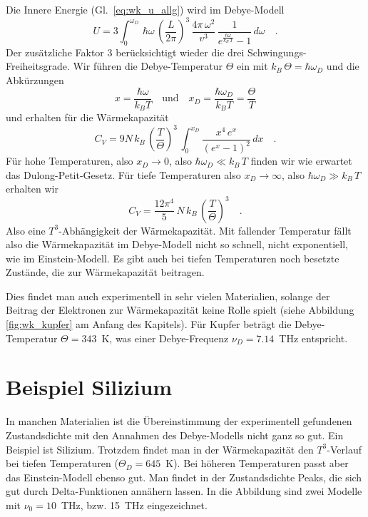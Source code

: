 Die Innere Energie (Gl.~\ref{eq:wk_u_allg}) wird im Debye-Modell
\begin{equation}
U = 3 \int_0^{\omega_D} \, \hbar \omega \,  \left( \frac{L}{2 \pi} \right)^3 \,     \frac{ 4 \pi \, \omega^2 }{v^3}  \,
\frac{1}{e^{\frac{\hbar \omega}{k_B \, T} }- 1} \, d\omega \quad .
\end{equation}
Der zusätzliche Faktor 3 berücksichtigt wieder die drei Schwingungs-Freiheitsgrade. Wir führen die Debye-Temperatur $\Theta$ ein mit $k_B \, \Theta = \hbar \omega_D$ und die Abkürzungen
\begin{equation}
x = \frac{\hbar \omega}{k_B T} \quad \text{und} \quad
x_D = \frac{\hbar \omega_D}{k_B T}  = \frac{\Theta}{T}
\end{equation}
und erhalten für die Wärmekapazität
\begin{equation}
C_V = 9 N \, k_B \, \left(\frac{T}{\Theta} \right)^3 \,
\int_0^{x_D} \frac{x^4 \, e^x}{\left(  e^x - 1 \right)^2} \, dx \quad .
\end{equation}
Für hohe Temperaturen, also $x_D \rightarrow 0$, also $\hbar  \omega_D \ll k_B \, T$ finden wir wie erwartet das Dulong-Petit-Gesetz. Für tiefe Temperaturen also $x_D \rightarrow \infty$, also $\hbar  \omega_D \gg k_B \, T$  erhalten wir
\begin{equation}
C_V = \frac{12 \pi^4}{5} \, N \, k_B \, \left(\frac{T}{\Theta} \right)^3 \quad .
\end{equation}
Also eine $T^3$-Abhängigkeit der Wärmekapazität. Mit fallender Temperatur fällt also die Wärmekapazität im Debye-Modell nicht so schnell, nicht exponentiell, wie im Einstein-Modell. Es gibt auch bei tiefen Temperaturen noch besetzte Zustände, die zur Wärmekapazität beitragen.

Dies findet man auch experimentell in sehr vielen Materialien, solange der Beitrag der Elektronen zur Wärmekapazität keine Rolle spielt (siehe Abbildung \ref{fig:wk_kupfer} am Anfang des Kapitels). Für Kupfer beträgt die Debye-Temperatur $\Theta = 343$~K, was einer Debye-Frequenz $\nu_D = 7.14$~THz entspricht.



\section{Beispiel Silizium}

In manchen Materialien ist die Übereinstimmung der experimentell gefundenen Zustandsdichte mit den Annahmen des Debye-Modells nicht ganz so gut. Ein Beispiel ist Silizium. Trotzdem findet man in der Wärmekapazität den $T^3$-Verlauf bei tiefen Temperaturen ($\Theta_D = 645$~K). Bei höheren Temperaturen passt aber das Einstein-Modell ebenso gut. Man findet in der Zustandsdichte Peaks, die sich gut durch Delta-Funktionen annähern lassen.  In die Abbildung sind zwei Modelle mit $\nu_0 = 10$~THz, bzw. 15~THz eingezeichnet.




